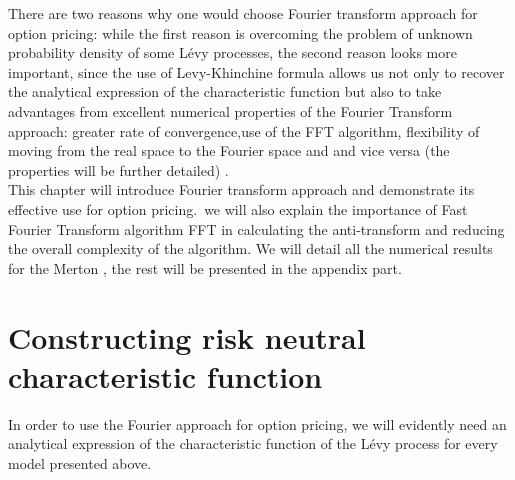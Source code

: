 \documentclass[12pt]{report}
\begin{document}
There are two reasons why one would choose Fourier transform approach for option pricing: while the first reason is overcoming the problem of unknown  probability density of some Lévy processes, the second reason looks more important, since the use of Levy-Khinchine formula allows us not only to recover the analytical expression of the characteristic function but also to take advantages from excellent numerical properties of the Fourier Transform approach: greater rate of convergence,use of the FFT algorithm, flexibility of moving from the real space to the Fourier space and and vice versa (the properties will be further detailed) . \\

This chapter will introduce Fourier transform approach and demonstrate its effective use for option pricing.~we will also explain the importance of Fast Fourier Transform algorithm FFT in calculating the anti-transform and reducing the overall complexity of the algorithm. We will detail all the numerical results for the Merton , the rest will be presented in the appendix part. 
\newpage
\section{Constructing risk neutral characteristic  function }

In order to use the Fourier approach for option pricing,  we will  evidently need an analytical expression of the characteristic function of the Lévy process for every model presented above.\\
\end{document}
